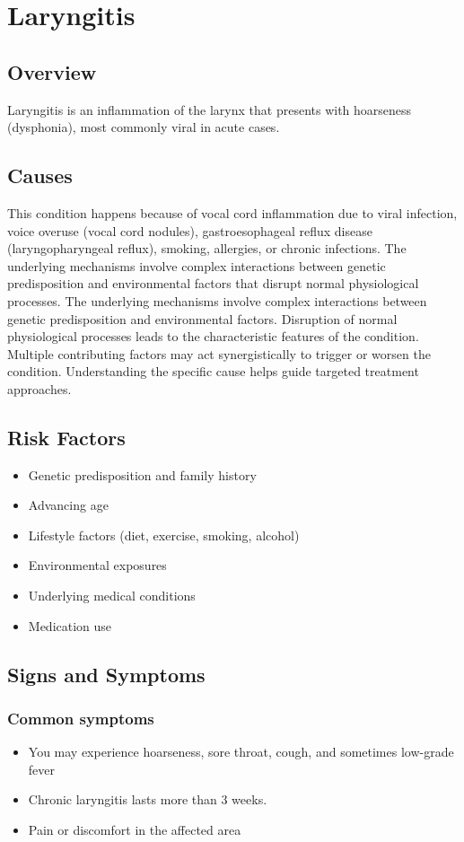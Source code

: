 \chapter{Laryngitis}
\label{sec:Laryngitis}

\section{Overview}
Laryngitis is an inflammation of the larynx that presents with hoarseness (dysphonia), most commonly viral in acute cases.
\section{Causes}
This condition happens because of vocal cord inflammation due to viral infection, voice overuse (vocal cord nodules), gastroesophageal reflux disease (laryngopharyngeal reflux), smoking, allergies, or chronic infections. The underlying mechanisms involve complex interactions between genetic predisposition and environmental factors that disrupt normal physiological processes. The underlying mechanisms involve complex interactions between genetic predisposition and environmental factors. Disruption of normal physiological processes leads to the characteristic features of the condition. Multiple contributing factors may act synergistically to trigger or worsen the condition. Understanding the specific cause helps guide targeted treatment approaches.
\section{Risk Factors}


\begin{itemize}[noitemsep]
  \item Genetic predisposition and family history
  \item Advancing age
  \item Lifestyle factors (diet, exercise, smoking, alcohol)
  \item Environmental exposures
  \item Underlying medical conditions
  \item Medication use
\end{itemize}
\section{Signs and Symptoms}

\subsection{Common symptoms}
\begin{itemize}[noitemsep]
  \item You may experience hoarseness, sore throat, cough, and sometimes low-grade fever
  \item Chronic laryngitis lasts more than 3 weeks.
  \item Pain or discomfort in the affected area
  \end{itemize}

